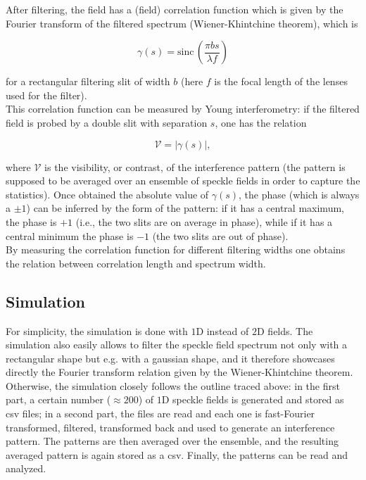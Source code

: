 After filtering, the field has a (field) correlation function which is given by the Fourier transform of the filtered spectrum (Wiener-Khintchine theorem), 
which is

\begin{equation} \label{rect-corr}
    \gamma(s) = \mathrm{sinc}\,\left( \frac{\pi bs}{\lambda f} \right)
\end{equation}

for a rectangular filtering slit of width $b$ (here $f$ is the focal length of the lenses used for the filter). \\

This correlation function can be measured by Young interferometry: if the filtered field is probed by a double slit with separation $s$, one has the relation 

\begin{equation}
    \mathcal V = |\gamma(s)|,
\end{equation}

where $\mathcal V$ is the visibility, or contrast, of the interference pattern (the pattern is supposed to be averaged over an ensemble of speckle fields 
in order to capture the statistics). Once obtained the absolute value of $\gamma(s)$, the phase (which is always a $\pm 1$) can be inferred by the form of the 
pattern: if it has a central maximum, the phase is $+1$ (i.e., the two slits are on average in phase), while if it has a central minimum the phase is $-1$ 
(the two slits are out of phase). \\

By measuring the correlation function for different filtering widths one obtains the relation between correlation length and spectrum width.

\subsection{Simulation}

For simplicity, the simulation is done with $1$D instead of $2$D fields. The simulation also easily allows to filter the speckle field spectrum not only with 
a rectangular shape but e.g. with a gaussian shape, and it therefore showcases directly the Fourier transform relation given by the Wiener-Khintchine theorem. \\

Otherwise, the simulation closely follows the outline traced above: in the first part, a certain number ($\approx 200$) of $1$D speckle fields is generated 
and stored as csv files; in a second part, the  files are read and each one is fast-Fourier transformed, filtered, transformed back and used to generate an 
interference pattern. The patterns are then averaged over the ensemble, and the resulting averaged pattern is again stored as a csv. Finally, the patterns can 
be read and analyzed. \\

